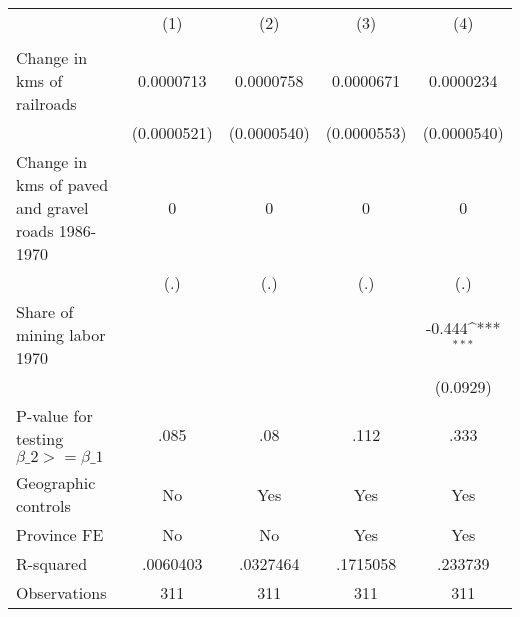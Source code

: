 {
\def\sym#1{\ifmmode^{#1}\else\(^{#1}\)\fi}
\begin{tabular}{l*{4}{c}}
\hline\hline
                &\multicolumn{1}{c}{(1)}&\multicolumn{1}{c}{(2)}&\multicolumn{1}{c}{(3)}&\multicolumn{1}{c}{(4)}\\
                &\multicolumn{1}{c}{}&\multicolumn{1}{c}{}&\multicolumn{1}{c}{}&\multicolumn{1}{c}{}\\
\hline
Change in kms of railroads&0.0000713         &0.0000758         &0.0000671         &0.0000234         \\
                &(0.0000521)         &(0.0000540)         &(0.0000553)         &(0.0000540)         \\
[1em]
Change in kms of paved and gravel roads 1986-1970&        0         &        0         &        0         &        0         \\
                &      (.)         &      (.)         &      (.)         &      (.)         \\
[1em]
Share of mining labor 1970&                  &                  &                  &   -0.444\sym{***}\\
                &                  &                  &                  & (0.0929)         \\
\hline
P-value for testing $\beta\_{2} >= \beta\_{1}$&     .085         &      .08         &     .112         &     .333         \\
Geographic controls&       No         &      Yes         &      Yes         &      Yes         \\
Province FE     &       No         &       No         &      Yes         &      Yes         \\
R-squared       & .0060403         & .0327464         & .1715058         &  .233739         \\
Observations    &      311         &      311         &      311         &      311         \\
\hline\hline
\end{tabular}
}
